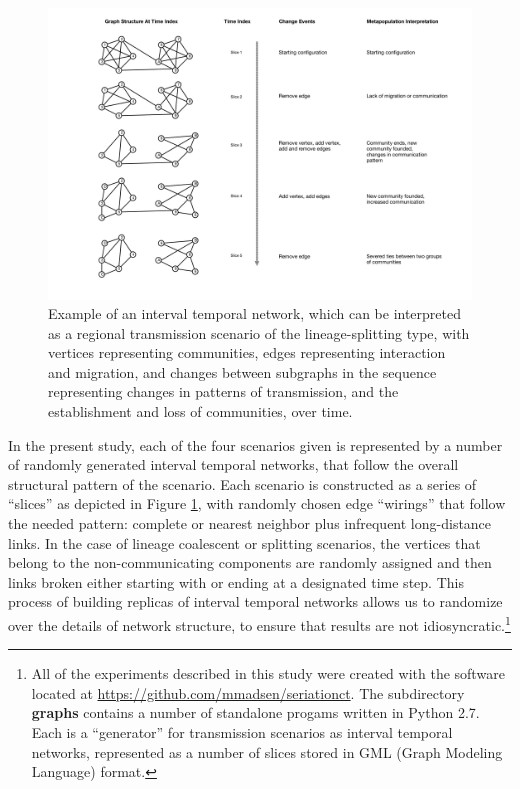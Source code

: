     \begin{figure}[ht]
    \centering
    \includegraphics[scale=0.25]{graphics/multipleseriation/interval-temporal-network-with-interpretation.pdf}
    \caption{Example of an interval temporal network, which can be interpreted as a regional transmission scenario of the lineage-splitting type, with vertices representing communities, edges representing interaction and migration, and changes between subgraphs in the sequence representing changes in patterns of transmission, and the establishment and loss of communities, over time.}
    \label{metapop:fig:itn-example}
    \end{figure}
    
    
    In the present study, each of the four scenarios given is represented by a number of randomly generated interval temporal networks, that follow the overall structural pattern of the scenario.  Each scenario is constructed as a series of ``slices'' as depicted in Figure \ref{metapop:fig:itn-example}, with randomly chosen edge ``wirings'' that follow the needed pattern:  complete or nearest neighbor plus infrequent long-distance links.  In the case of lineage coalescent or splitting scenarios, the vertices that belong to the non-communicating components are randomly assigned and then links broken either starting with or ending at a designated time step.  This process of building replicas of interval temporal networks allows us to randomize over the details of network structure, to ensure that results are not idiosyncratic.\footnote{All of the experiments described in this study were created with the software located at \url{https://github.com/mmadsen/seriationct}.  The subdirectory \textbf{graphs} contains a number of standalone progams written in Python 2.7.  Each is a ``generator'' for transmission scenarios as interval temporal networks, represented as a number of slices stored in GML (Graph Modeling Language) format.}
    

